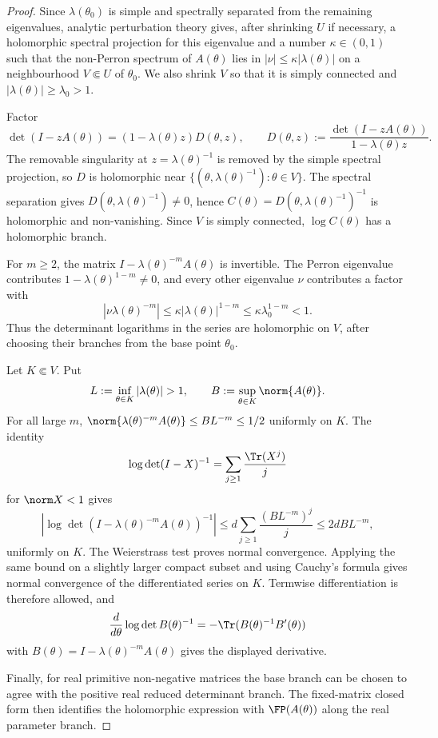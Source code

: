 \begin{proof}
  Since \(\lambda(\theta_0)\) is simple and spectrally separated from the
  remaining eigenvalues, analytic perturbation theory gives, after shrinking
  \(U\) if necessary, a holomorphic spectral projection for this eigenvalue and
  a number \(\kappa\in(0,1)\) such that the non-Perron spectrum of
  \(A(\theta)\) lies in \(|\nu|\le\kappa|\lambda(\theta)|\) on a neighbourhood
  \(V\Subset U\) of \(\theta_0\).  We also shrink \(V\) so that it is simply
  connected and \(|\lambda(\theta)|\ge\lambda_0>1\).

  Factor
  \[
    \det(I-zA(\theta))=(1-\lambda(\theta)z)D(\theta,z),
    \qquad
    D(\theta,z):=\frac{\det(I-zA(\theta))}{1-\lambda(\theta)z}.
  \]
  The removable singularity at \(z=\lambda(\theta)^{-1}\) is removed by the
  simple spectral projection, so \(D\) is holomorphic near
  \(\{(\theta,\lambda(\theta)^{-1}):\theta\in V\}\).  The spectral separation
  gives \(D(\theta,\lambda(\theta)^{-1})\ne0\), hence
  \(C(\theta)=D(\theta,\lambda(\theta)^{-1})^{-1}\) is holomorphic and
  non-vanishing.  Since \(V\) is simply connected, \(
  \log C(\theta)\) has a holomorphic branch.

  For \(m\ge2\), the matrix \(I-\lambda(\theta)^{-m}A(\theta)\) is invertible.
  The Perron eigenvalue contributes \(1-\lambda(\theta)^{1-m}\ne0\), and every
  other eigenvalue \(\nu\) contributes a factor with
  \[
    |\nu\lambda(\theta)^{-m}|
    \le \kappa|\lambda(\theta)|^{1-m}
    \le \kappa\lambda_0^{1-m}<1.
  \]
  Thus the determinant logarithms in the series are holomorphic on \(V\), after
  choosing their branches from the base point \(\theta_0\).

  Let \(K\Subset V\).  Put
  \[
    L:=\inf_{\theta\in K}|\lambda(\theta)|>1,
    \qquad
    B:=\sup_{\theta\in K}\norm{A(\theta)}.
  \]
  For all large \(m\), \(\norm{\lambda(\theta)^{-m}A(\theta)}\le BL^{-m}\le1/2\)
  uniformly on \(K\).  The identity
  \[
    \log\det(I-X)^{-1}=\sum_{j\ge1}\frac{\Tr(X^j)}{j}
  \]
  for \(\norm X<1\) gives
  \[
    \left|
      \log\det(I-\lambda(\theta)^{-m}A(\theta))^{-1}
    \right|
    \le d\sum_{j\ge1}\frac{(BL^{-m})^j}{j}
    \le 2dB L^{-m},
  \]
  uniformly on \(K\).  The Weierstrass test proves normal convergence.  Applying
  the same bound on a slightly larger compact subset and using Cauchy's formula
  gives normal convergence of the differentiated series on \(K\).  Termwise
  differentiation is therefore allowed, and
  \[
    \frac{d}{d\theta}\log\det B(\theta)^{-1}
    =-\Tr(B(\theta)^{-1}B'(\theta))
  \]
  with \(B(\theta)=I-\lambda(\theta)^{-m}A(\theta)\) gives the displayed
  derivative.

  Finally, for real primitive non-negative matrices the base branch can be
  chosen to agree with the positive real reduced determinant branch.  The
  fixed-matrix closed form  then
  identifies the holomorphic expression with \(\FP(A(\theta))\) along the real
  parameter branch.
\end{proof}

